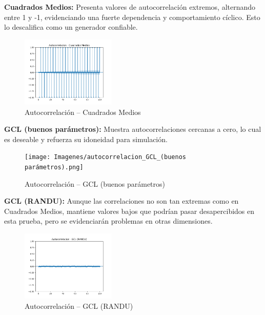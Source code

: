 \documentclass{article}
\begin{document}
\begin{multicols}{2}
\setlength{\floatsep}{0pt}
\setlength{\textfloatsep}{0pt}
\setlength{\intextsep}{0pt}
\setlength{\abovecaptionskip}{0pt}
\setlength{\belowcaptionskip}{0pt}
\textbf{Cuadrados Medios:} Presenta valores de autocorrelación extremos, alternando entre 1 y -1, evidenciando una fuerte dependencia y comportamiento cíclico. Esto lo descalifica como un generador confiable.


\begin{figure}[H]
\centering
\includegraphics[width=0.4\textwidth]{Imagenes/autocorrelacion_Cuadrados Medios.png}
\caption{Autocorrelación – Cuadrados Medios}
\end{figure}


\textbf{GCL (buenos parámetros):} Muestra autocorrelaciones cercanas a cero, lo cual es deseable y refuerza su idoneidad para simulación.

\begin{figure}[H]
\centering
\texttt{[image: Imagenes/autocorrelacion\_GCL\_(buenos parámetros).png]}
\caption{Autocorrelación – GCL (buenos parámetros)}
\end{figure}



\textbf{GCL (RANDU):} Aunque las correlaciones no son tan extremas como en Cuadrados Medios, mantiene valores bajos que podrían pasar desapercibidos en esta prueba, pero se evidenciarán problemas en otras dimensiones.

\begin{figure}[H]
\centering
\includegraphics[width=0.4\textwidth]{Imagenes/autocorrelacion_GCL (RANDU).png}
\caption{Autocorrelación – GCL (RANDU)}
\end{figure}


\end{multicols}
\end{document}
